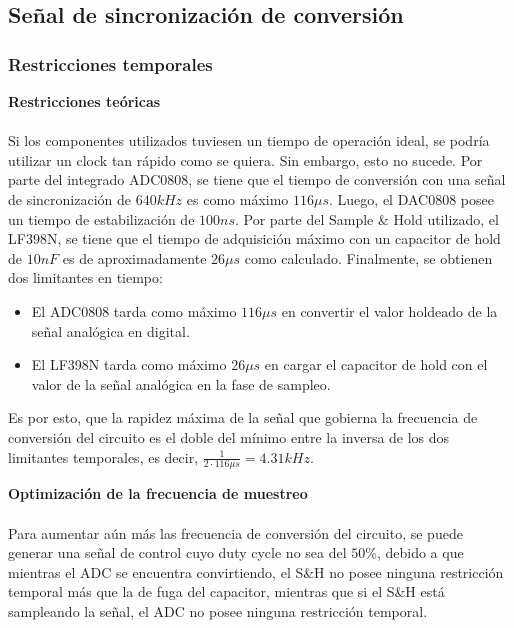 \subsection{Señal de sincronización de conversión}

\subsubsection{Restricciones temporales}
\vspace{0.2cm}
\textbf{Restricciones teóricas}\\
\\
Si los componentes utilizados tuviesen un tiempo de operación ideal, se podría utilizar un clock tan rápido como se quiera. Sin embargo, esto no sucede. Por parte del integrado ADC0808, se tiene que el tiempo de conversión con una señal de sincronización de $640kHz$ es como máximo $116\mu s$. Luego, el DAC0808 posee un tiempo de estabilización de $100ns$. Por parte del Sample \& Hold utilizado, el LF398N, se tiene que el tiempo de adquisición máximo con un capacitor de hold de $10nF$ es de aproximadamente $26\mu s$ como calculado. Finalmente, se obtienen dos limitantes en tiempo: 

\begin{itemize}
\item El ADC0808 tarda como máximo $116\mu s$ en convertir el valor holdeado de la señal analógica en digital.
\item El LF398N tarda como máximo $26\mu s$ en cargar el capacitor de hold con el valor de la señal analógica en la fase de sampleo.
\end{itemize}

Es por esto, que la rapidez máxima de la señal que gobierna la frecuencia de conversión del circuito es el doble del mínimo entre la inversa de los dos limitantes temporales, es decir, $\frac{1}{2\cdot 116\mu s} = 4.31kHz$.


\vspace{0.3cm}
\textbf{Optimización de la frecuencia de muestreo}\\
\\
Para aumentar aún más las frecuencia de conversión del circuito, se puede generar una señal de control cuyo duty cycle no sea del $50\%$, debido a que mientras el ADC se encuentra convirtiendo, el S\&H no posee ninguna restricción temporal más que la de fuga del capacitor, mientras que si el S\&H está sampleando la señal, el ADC no posee ninguna restricción temporal.


